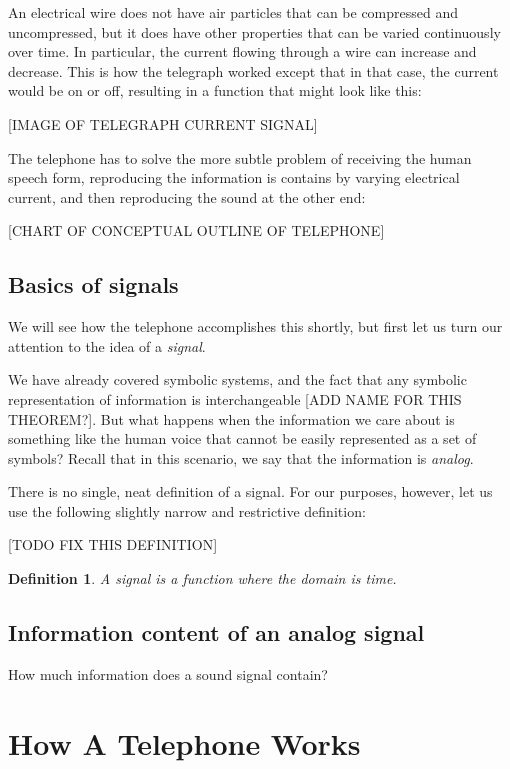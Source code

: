 \documentclass[UTF8]{book}
\newtheorem{definition}{Definition}
\begin{document}
\begin{CJK}{UTF8}{gbsn}
An electrical wire does not have air particles that can be compressed and uncompressed, but it does have other properties that can be varied continuously over time. In particular, the current flowing through a wire can increase and decrease. This is how the telegraph worked except that in that case, the current would be on or off, resulting in a function that might look like this:

[IMAGE OF TELEGRAPH CURRENT SIGNAL]

The telephone has to solve the more subtle problem of receiving the human speech form, reproducing the information is contains by varying electrical current, and then reproducing the sound at the other end:

[CHART OF CONCEPTUAL OUTLINE OF TELEPHONE]

\section{Basics of signals}

We will see how the telephone accomplishes this shortly, but first let us turn our attention to the idea of a \emph{signal}.

We have already covered symbolic systems, and the fact that any symbolic representation of information is interchangeable [ADD NAME FOR THIS THEOREM?]. But what happens when the information we care about is something like the human voice that cannot be easily represented as a set of symbols? Recall that in this scenario, we say that the information is \emph{analog}.

There is no single, neat definition of a signal. For our purposes, however, let us use the following slightly narrow and restrictive definition:

[TODO FIX THIS DEFINITION]

\begin{definition}
A \emph{signal} is a function where the domain is time.
\end{definition}

\section{Information content of an analog signal}

How much information does a sound signal contain?

\chapter{How A Telephone Works}


\end{CJK}
\end{document}
